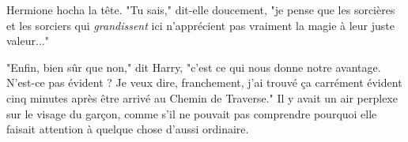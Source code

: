 Hermione hocha la tête. "Tu sais," dit-elle doucement, "je pense que les sorcières et les sorciers qui \emph{grandissent } ici n'apprécient pas vraiment la magie à leur juste valeur..."

"Enfin, bien sûr que non," dit Harry, "c'est ce qui nous donne notre avantage. N'est-ce pas évident ? Je veux dire, franchement, j'ai trouvé ça carrément évident cinq minutes après être arrivé au Chemin de Traverse." Il y avait un air perplexe sur le visage du garçon, comme s'il ne pouvait pas comprendre pourquoi elle faisait attention à quelque chose d'aussi ordinaire.


